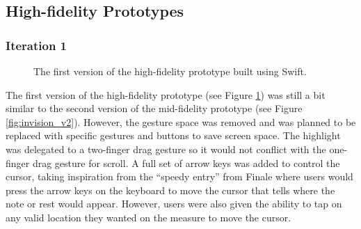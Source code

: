 		\subsection{High-fidelity Prototypes}
		\label{sec:high-fidelity-prototypes}

			\subsubsection{Iteration 1}

				\begin{figure}[H]
					\centering
				    \caption{The first version of the high-fidelity prototype built using Swift.}
				    \label{fig:flow_it1}
				\end{figure} 


				The first version of the high-fidelity prototype (see Figure \ref{fig:flow_it1}) was still a bit similar to the second version of the mid-fidelity prototype (see Figure \ref{fig:invision_v2}). However, the gesture space was removed and was planned to be replaced with specific gestures and buttons to save screen space. The highlight was delegated to a two-finger drag gesture so it would not conflict with the one-finger drag gesture for scroll. A full set of arrow keys was added to control the cursor, taking inspiration from the ``speedy entry'' from Finale where users would press the arrow keys on the keyboard to move the cursor that tells where the note or rest would appear. However, users were also given the ability to tap on any valid location they wanted on the measure to move the cursor. 

